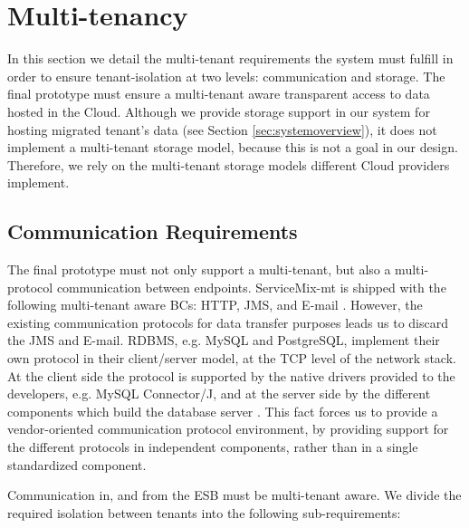 \section{Multi-tenancy}
\label{sec:specificationmultitenancy}

In this section we detail the multi-tenant requirements the system must fulfill in order to ensure tenant-isolation at two levels: communication and storage. The final prototype must ensure a multi-tenant aware transparent access to data hosted in the Cloud. Although we provide storage support in our system for hosting migrated tenant's data (see Section \ref{sec:systemoverview}), it does not implement a multi-tenant storage model, because this is not a goal in our design. Therefore, we rely on the multi-tenant storage models different Cloud providers implement.

\subsection{Communication Requirements}

The final prototype must not only support a multi-tenant, but also a multi-protocol communication between endpoints. ServiceMix-mt is shipped with the following multi-tenant aware \ac{BC}s: \ac{HTTP}, \ac{JMS}, and E-mail \cite{gomez2012}. However, the existing communication protocols for data transfer purposes leads us to discard the \ac{JMS} and E-mail. \ac{RDBMS}, e.g. MySQL and PostgreSQL, implement their own protocol in their client/server model, at the \ac{TCP} level of the network stack. At the client side the protocol is supported by the native drivers provided to the developers, e.g. MySQL Connector/J, and at the server side by the different components which build the database server \cite{mysqlmanual}. This fact forces us to provide a vendor-oriented communication protocol environment, by providing support for the different protocols in independent components, rather than in a single standardized component.

Communication in, and from the \ac{ESB} must be multi-tenant aware. We divide the required isolation between tenants into the following sub-requirements: 

